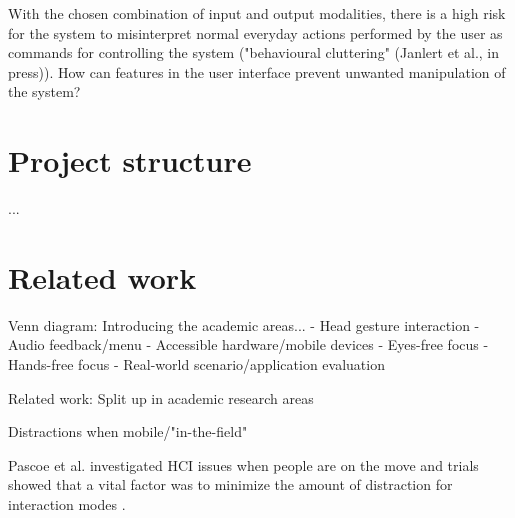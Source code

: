 With the chosen combination of input and output modalities, there is a high risk for the system to misinterpret normal everyday actions performed by the user as commands for controlling the system ("behavioural cluttering" (Janlert et al., in press)). How can features in the user interface prevent unwanted manipulation of the system?


\section{Project structure}
...

\section{Related work}
Venn diagram: Introducing the academic areas...
- Head gesture interaction
- Audio feedback/menu
- Accessible hardware/mobile devices
- Eyes-free focus
- Hands-free focus
- Real-world scenario/application evaluation

Related work: Split up in academic research areas







Distractions when mobile/"in-the-field"

Pascoe et al. investigated HCI issues when people are on the move and trials showed that a vital factor was to minimize the amount of distraction for interaction modes \cite{pascoe_using_2000}.

